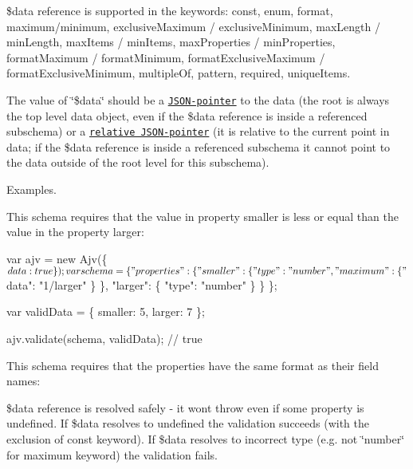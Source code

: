 {\ttfamily \$data} reference is supported in the keywords\+: const, enum, format, maximum/minimum, exclusive\+Maximum / exclusive\+Minimum, max\+Length / min\+Length, max\+Items / min\+Items, max\+Properties / min\+Properties, format\+Maximum / format\+Minimum, format\+Exclusive\+Maximum / format\+Exclusive\+Minimum, multiple\+Of, pattern, required, unique\+Items.

The value of \char`\"{}\$data\char`\"{} should be a \href{https://tools.ietf.org/html/rfc6901}{\tt J\+S\+O\+N-\/pointer} to the data (the root is always the top level data object, even if the \$data reference is inside a referenced subschema) or a \href{http://tools.ietf.org/html/draft-luff-relative-json-pointer-00}{\tt relative J\+S\+O\+N-\/pointer} (it is relative to the current point in data; if the \$data reference is inside a referenced subschema it cannot point to the data outside of the root level for this subschema).

Examples.

This schema requires that the value in property {\ttfamily smaller} is less or equal than the value in the property larger\+:


\begin{DoxyCode}
var ajv = new Ajv(\{$data: true\});

var schema = \{
  "properties": \{
    "smaller": \{
      "type": "number",
      "maximum": \{ "$data": "1/larger" \}
    \},
    "larger": \{ "type": "number" \}
  \}
\};

var validData = \{
  smaller: 5,
  larger: 7
\};

ajv.validate(schema, validData); // true
\end{DoxyCode}


This schema requires that the properties have the same format as their field names\+:




{\ttfamily \$data} reference is resolved safely -\/ it won\textquotesingle{}t throw even if some property is undefined. If {\ttfamily \$data} resolves to {\ttfamily undefined} the validation succeeds (with the exclusion of {\ttfamily const} keyword). If {\ttfamily \$data} resolves to incorrect type (e.\+g. not \char`\"{}number\char`\"{} for maximum keyword) the validation fails.

